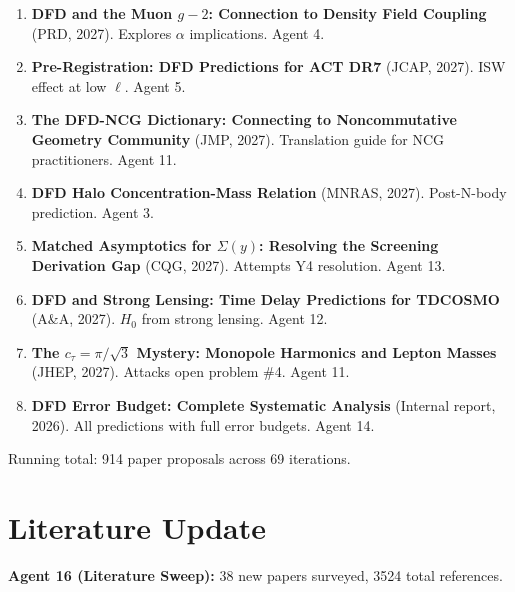 \documentclass[11pt,a4paper]{article}
\begin{document}
\begin{enumerate}[nosep]
\item \textbf{DFD and the Muon $g-2$: Connection to Density Field Coupling} (PRD, 2027). Explores $\alpha$ implications. Agent 4.

\item \textbf{Pre-Registration: DFD Predictions for ACT DR7} (JCAP, 2027). ISW effect at low $\ell$. Agent 5.

\item \textbf{The DFD-NCG Dictionary: Connecting to Noncommutative Geometry Community} (JMP, 2027). Translation guide for NCG practitioners. Agent 11.

\item \textbf{DFD Halo Concentration-Mass Relation} (MNRAS, 2027). Post-N-body prediction. Agent 3.

\item \textbf{Matched Asymptotics for $\Sigma(y)$: Resolving the Screening Derivation Gap} (CQG, 2027). Attempts Y4 resolution. Agent 13.

\item \textbf{DFD and Strong Lensing: Time Delay Predictions for TDCOSMO} (A\&A, 2027). $H_0$ from strong lensing. Agent 12.

\item \textbf{The $c_\tau = \pi/\sqrt{3}$ Mystery: Monopole Harmonics and Lepton Masses} (JHEP, 2027). Attacks open problem \#4. Agent 11.

\item \textbf{DFD Error Budget: Complete Systematic Analysis} (Internal report, 2026). All predictions with full error budgets. Agent 14.
\end{enumerate}

Running total: 914 paper proposals across 69 iterations.


\section{Literature Update}

\textbf{Agent 16 (Literature Sweep):} 38 new papers surveyed, 3524 total references.
\end{document}
